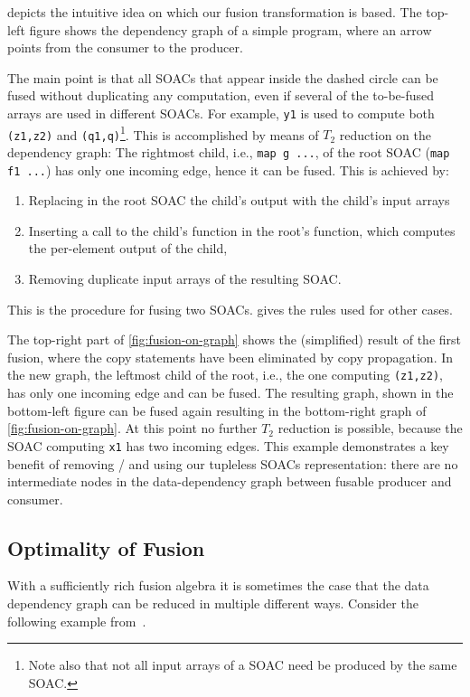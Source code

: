  depicts the intuitive idea on which our
fusion transformation is based.  The top-left figure shows the
dependency graph of a simple program, where an arrow points from the
consumer to the producer.

The main point is that all SOACs that appear inside the dashed circle
can be fused without duplicating any computation, even if several of
the to-be-fused arrays are used in different SOACs.  For example,
\texttt{y1} is used to compute both \texttt{(z1,z2)} and
\texttt{(q1,q)}\footnote{Note also that not all input arrays of a SOAC
  need be produced by the same SOAC.}.  This is accomplished by means
of $T_2$ reduction on the dependency graph: The rightmost child, i.e.,
\lstinline{map g ...}, of the root SOAC (\lstinline{map f1 ...})  has
only one incoming edge, hence it can be fused.  This is achieved by:
\begin{enumerate}
\item Replacing in the root SOAC the child's output with the child's
  input arrays
\item Inserting a call to the child's function in the root's function,
  which computes the per-element output of the child,
\item Removing duplicate input arrays of the resulting SOAC.
\end{enumerate}
This is the procedure for fusing two  SOACs.
 gives the rules used for other cases.

The top-right part of \cref{fig:fusion-on-graph} shows the
(simplified) result of the first fusion, where the copy statements
have been eliminated by copy propagation.  In the new graph, the
leftmost child of the root, i.e., the one computing \texttt{(z1,z2)},
has only one incoming edge and can be fused.  The resulting graph,
shown in the bottom-left figure can be fused again resulting in the
bottom-right graph of \cref{fig:fusion-on-graph}.  At this point no
further $T_2$ reduction is possible, because the SOAC computing
\texttt{x1} has two incoming edges.  This example demonstrates a key
benefit of removing / and using our tupleless SOACs
representation: there are no intermediate nodes in the data-dependency
graph between fusable producer and consumer.

\subsection{Optimality of Fusion}

With a sufficiently rich fusion algebra it is sometimes the case that
the data dependency graph can be reduced in multiple different ways.
Consider the following example
from~\cite{Robinson:2014:FFI:2636228.2636235}.

